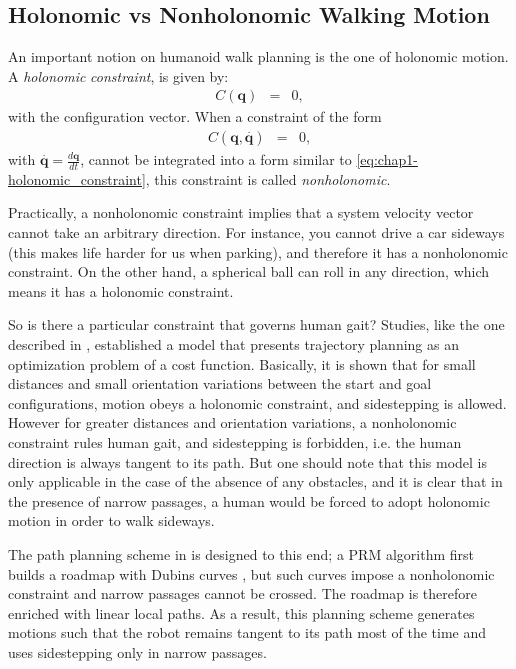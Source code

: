 \subsection{Holonomic vs Nonholonomic Walking Motion}
\label{subsec:chap1-holonomic}

An important notion on humanoid walk planning is the one of holonomic
motion.
A \emph{holonomic} \emph{constraint}, is given by:
\begin{eqnarray} C(\mathbf{q}) & = & 0,
  \label{eq:chap1-holonomic_constraint}
\end{eqnarray}
with \config{} the configuration vector. When a constraint of the form
\begin{eqnarray}
  C(\mathbf{q,}\overset{.}{\mathbf{q}}) & = & 0,
\end{eqnarray}
with $\mathbf{\overset{.}{\mathbf{q}}=}\frac{d\mathbf{q}}{dt}$, cannot
be integrated into a form similar to \ref{eq:chap1-holonomic_constraint},
this constraint is called \emph{nonholonomic}.

Practically, a nonholonomic constraint implies that a system velocity
vector cannot take an arbitrary direction. For instance, you cannot
drive a car sideways (this makes life harder for us when parking), and
therefore it has a nonholonomic constraint. On the other hand, a
spherical ball can roll in any direction, which means it has a
holonomic constraint.

So is there a particular constraint that governs human gait? Studies,
like the one described in \cite{momb10}, established a model that
presents trajectory planning as an optimization problem of a cost
function. Basically, it is shown that for small distances and small
orientation variations between the start and goal configurations,
motion obeys a holonomic constraint, and sidestepping is allowed.
However for greater distances and orientation variations, a
nonholonomic constraint rules human gait, and sidestepping is
forbidden, i.e. the human direction is always tangent to its path.
But one should note that this model is only applicable in the case of
the absence of any obstacles, and it is clear that in the presence of
narrow passages, a human would be forced to adopt holonomic motion in
order to walk sideways.

The path planning scheme in \cite{yosh08} is designed to this end; a
PRM algorithm first builds a roadmap with Dubins curves \cite{dubi57},
but such curves impose a nonholonomic constraint and narrow passages
cannot be crossed. The roadmap is therefore enriched with linear local
paths. As a result, this planning scheme generates motions such that
the robot remains tangent to its path most of the time and uses
sidestepping only in narrow passages.

